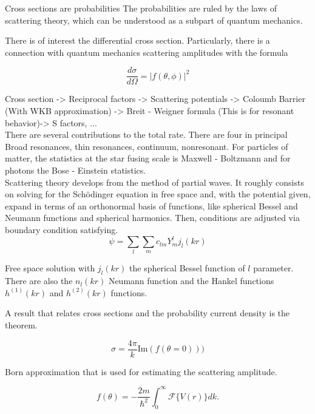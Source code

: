 \documentclass[openany]{book}
\begin{document}
Cross sections are probabilities 
The probabilities are ruled by the laws of scattering theory, which can be understood as a subpart of quantum mechanics. 

There is of interest the differential cross section. Particularly, there is a connection with quantum mechanics scattering amplitudes with the formula

\begin{equation}
	\frac{d\sigma}{d\Omega} = |f(\theta, \phi)|^2
\end{equation}

Cross section -> Reciprocal factors -> Scattering potentials -> Coloumb Barrier (With WKB approximation) -> Breit - Weigner formula (This is for resonant behavior)-> S factors, ... \\ 

There are several contributions  to the total rate. There are four in principal 
Broad resonances, thin resonances, continuum, nonresonant. For particles of matter, the statistics at the star fusing scale is Maxwell - Boltzmann and for photons the Bose - Einstein statistics. \\ 

Scattering theory develops from the method of partial waves. It roughly consists on solving for the Schödinger equation in free space and, with the potential given, expand in terms of an orthonormal basis of functions, like spherical Bessel and Neumann functions and spherical harmonics. Then, conditions are adjusted via boundary condition satisfying. \\

\begin{equation}
	\psi = \sum_{l} \sum_{m} {c_{lm}Y_{m}^{l}j_l(kr)}
\end{equation}

Free space solution with $j_l(kr)$ the spherical Bessel function of $l$ parameter. There are also the $n_l(kr)$ Neumann function and the Hankel functions $h^{(1)}(kr)$ and $h^{(2)}(kr)$ functions.

A result that relates cross sections and the probability current density is the  theorem. 

\begin{equation}
	\sigma = \frac{4 \pi }{k} \mathrm{Im}(f(\theta = 0)))
\end{equation}

Born approximation that is used for estimating the scattering amplitude.

\begin{equation}
	f(\theta) =   - \frac{2m}{\hbar^2} \int_{0}^{\infty} {\mathcal{F}\{V(r)\}dk}.
\end{equation}
\end{document}
